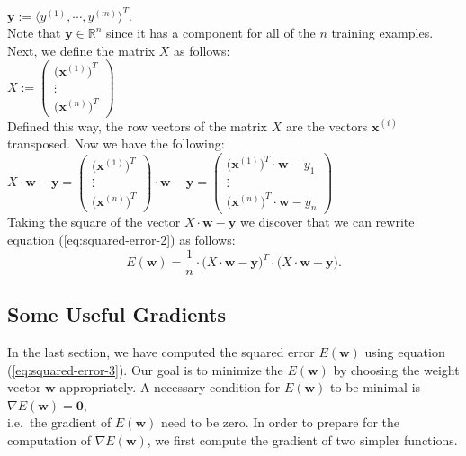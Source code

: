 \\[0.2cm]
\hspace*{1.3cm}
$\mathbf{y} := \langle y^{(1)}, \cdots, y^{(m)} \rangle^T$.
\\[0.2cm]
Note that $\mathbf{y} \in \mathbb{R}^n$ since it has a component for all of the $n$ training
examples.  Next, we define the matrix $X$ as follows:
\\[0.2cm]
\hspace*{1.3cm}
$X := \left(
  \begin{array}{c}
    \bigl(\mathbf{x}^{(1)}\bigr)^T  \\
    \vdots                         \\
    \bigl(\mathbf{x}^{(n)}\bigr)^T
  \end{array}
  \right)   
$
\\[0.2cm]
Defined this way, the row vectors of the matrix $X$ are the vectors $\mathbf{x}^{(i)}$ transposed.
Now we have the following:
\\[0.2cm]
\hspace*{1.3cm}
$X \cdot \mathbf{w} - \mathbf{y} = \left(
  \begin{array}{c}
    \bigl(\mathbf{x}^{(1)}\bigr)^T  \\
    \vdots                         \\
    \bigl(\mathbf{x}^{(n)}\bigr)^T
  \end{array}
  \right) \cdot \mathbf{w} - \mathbf{y} = \left(
  \begin{array}{c}
    \bigl(\mathbf{x}^{(1)}\bigr)^T \cdot \mathbf{w} - y_1 \\
    \vdots                         \\
    \bigl(\mathbf{x}^{(n)}\bigr)^T \cdot \mathbf{w} - y_n
  \end{array}
  \right)
$
\\[0.2cm]
Taking the square of the vector $X \cdot \mathbf{w} - \mathbf{y}$ we discover that
we can rewrite equation (\ref{eq:squared-error-2}) as follows:
\begin{equation}
  \label{eq:squared-error-3}
  E(\mathbf{w}) = \frac{1}{n} \cdot \bigl(X \cdot \mathbf{w} - \textbf{y}\bigr)^T \cdot 
                                    \bigl(X \cdot \mathbf{w} - \textbf{y}\bigr).
\end{equation}

\subsection{Some Useful Gradients}
In the last section, we have computed the squared error $E(\mathbf{w})$ using equation
(\ref{eq:squared-error-3}).  Our goal is to minimize the $E(\mathbf{w})$ by choosing the weight
vector $\mathbf{w}$ appropriately.  A necessary condition for $E(\mathbf{w})$ to be minimal is 
\\[0.2cm]
\hspace*{1.3cm}
$\nabla E(\mathbf{w}) = \mathbf{0}$,
\\[0.2cm]
i.e.~the gradient of $E(\mathbf{w})$ need to be zero.  In order to prepare for the computation of
$\nabla E(\mathbf{w})$, we first compute the gradient of two simpler functions.


